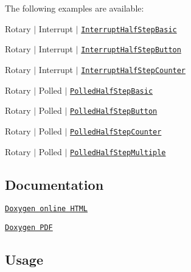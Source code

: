 The following examples are available\+:
\begin{DoxyItemize}
\item Rotary $\vert$ Interrupt $\vert$ \href{https://github.com/Erriez/ErriezRotary/blob/master/examples/Interrupt/InterruptHalfStepBasic/InterruptHalfStepBasic.ino}{\tt Interrupt\+Half\+Step\+Basic}
\item Rotary $\vert$ Interrupt $\vert$ \href{https://github.com/Erriez/ErriezRotary/blob/master/examples/Interrupt/InterruptHalfStepButton/InterruptHalfStepButton.ino}{\tt Interrupt\+Half\+Step\+Button}
\item Rotary $\vert$ Interrupt $\vert$ \href{https://github.com/Erriez/ErriezRotary/blob/master/examples/Interrupt/InterruptHalfStepCounter/InterruptHalfStepCounter.ino}{\tt Interrupt\+Half\+Step\+Counter}
\item Rotary $\vert$ Polled $\vert$ \href{https://github.com/Erriez/ErriezRotary/blob/master/examples/Polled/PolledHalfStepBasic/PolledHalfStepBasic.ino}{\tt Polled\+Half\+Step\+Basic}
\item Rotary $\vert$ Polled $\vert$ \href{https://github.com/Erriez/ErriezRotary/blob/master/examples/Polled/PolledHalfStepButton/PolledHalfStepButton.ino}{\tt Polled\+Half\+Step\+Button}
\item Rotary $\vert$ Polled $\vert$ \href{https://github.com/Erriez/ErriezRotary/blob/master/examples/Polled/PolledHalfStepCounter/PolledHalfStepCounter.ino}{\tt Polled\+Half\+Step\+Counter}
\item Rotary $\vert$ Polled $\vert$ \href{https://github.com/Erriez/ErriezRotary/blob/master/examples/Polled/PolledHalfStepMultiple/PolledHalfStepMultiple.ino}{\tt Polled\+Half\+Step\+Multiple}
\end{DoxyItemize}

\subsection*{Documentation}


\begin{DoxyItemize}
\item \href{https://Erriez.github.io/ErriezRotaryEncoderHalfStep}{\tt Doxygen online H\+T\+ML}
\item \href{https://github.com/Erriez/ErriezRotaryEncoderHalfStep/raw/gh-pages/latex/ErriezRotaryEncoderHalfStep.pdf}{\tt Doxygen P\+DF}
\end{DoxyItemize}

\subsection*{Usage}

